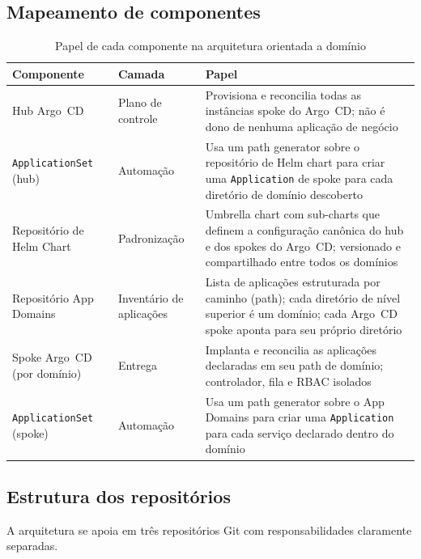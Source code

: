 \documentclass[11pt,a4paper]{article}
\begin{document}
\subsection{Mapeamento de componentes}

\begin{table}[H]
  \centering
  \caption{Papel de cada componente na arquitetura orientada a domínio}
  \label{tab:components}
  \small
  \begin{tabularx}{\linewidth}{@{} l l X @{}}
    \toprule
    \textbf{Componente} & \textbf{Camada} & \textbf{Papel} \\
    \midrule
    Hub Argo~CD
      & Plano de controle
      & Provisiona e reconcilia todas as instâncias spoke do Argo~CD; não é dono de
        nenhuma aplicação de negócio \\
    \texttt{ApplicationSet} (hub)
      & Automação
      & Usa um path generator sobre o repositório de Helm chart para criar uma
        \texttt{Application} de spoke para cada diretório de domínio descoberto \\
    Repositório de Helm Chart
      & Padronização
      & Umbrella chart com sub-charts que definem a configuração canônica do hub e dos
        spokes do Argo~CD; versionado e compartilhado entre todos os domínios \\
    Repositório App Domains
      & Inventário de aplicações
      & Lista de aplicações estruturada por caminho (path); cada diretório de nível
        superior é um domínio; cada Argo~CD spoke aponta para seu próprio diretório \\
    Spoke Argo~CD (por domínio)
      & Entrega
      & Implanta e reconcilia as aplicações declaradas em seu path de domínio;
        controlador, fila e RBAC isolados \\
    \texttt{ApplicationSet} (spoke)
      & Automação
      & Usa um path generator sobre o App Domains para criar uma \texttt{Application}
        para cada serviço declarado dentro do domínio \\
    \bottomrule
  \end{tabularx}
\end{table}

\subsection{Estrutura dos repositórios}

A arquitetura se apoia em três repositórios Git com responsabilidades claramente
separadas.
\end{document}
